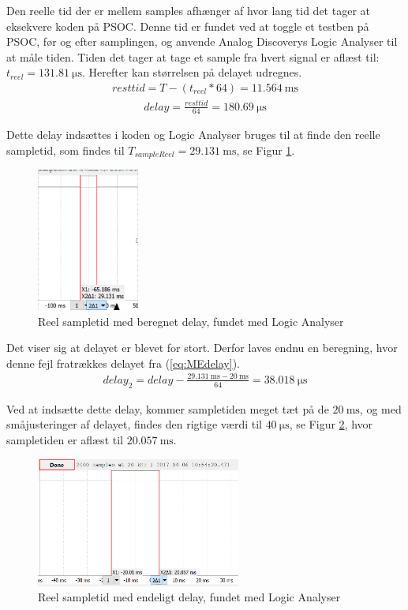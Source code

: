Den reelle tid der er mellem samples afhænger af hvor lang tid det tager at eksekvere koden på PSOC. Denne tid er fundet ved at toggle et testben på PSOC, før og efter samplingen, og anvende Analog Discoverys Logic Analyser til at måle tiden. Tiden det tager at tage et sample fra hvert signal er aflæst til: $t_{reel} = \SI{131,81}{\micro\second}$.  Herefter kan størrelsen på delayet udregnes.
\begin{align}
resttid = T - (t_{reel}*64) = \SI{11,564}{\milli\second}
\end{align}
\begin{align}
delay = \frac{resttid}{64} = \SI{180,69} {\micro\second}
\label{eq:MEdelay}
\end{align}

Dette delay indsættes i koden og Logic Analyser bruges til at finde den reelle sampletid, som findes til $T_{sampleReel} = \SI{29,131}{\milli\second}$, se Figur \ref{fig:MEsampleTest1}.

\begin{figure}[htbp] %
	\centering
	\includegraphics[width=0.3\textwidth]{Figure/MEtestSample1}
	\caption{Reel sampletid med beregnet delay, fundet med Logic Analyser}
	\label{fig:MEsampleTest1}
\end{figure}

Det viser sig at delayet er blevet for stort. Derfor laves endnu en beregning, hvor denne fejl fratrækkes delayet fra (\ref{eq:MEdelay}).
\begin{align}
delay_2 = delay - \frac{\SI{29.131}{\milli\second}-\SI{20}{\milli\second}}{64} = \SI{38,018} {\micro\second}
\end{align}

Ved at indsætte dette delay, kommer sampletiden meget tæt på de $\SI{20}{\milli\second}$, og med småjusteringer af delayet, findes den rigtige værdi til $\SI{40}{\micro\second}$, se Figur \ref{fig:MEsampleTest2}, hvor sampletiden er aflæst til $\SI{20,057}{\milli\second}$.

\begin{figure}[H] %
	\centering
	\includegraphics[width=0.6\textwidth]{Figure/MEtestSample2}
	\caption{Reel sampletid med endeligt delay, fundet med Logic Analyser}
	\label{fig:MEsampleTest2}
\end{figure}



